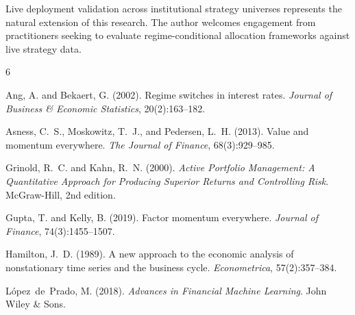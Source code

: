 \documentclass[12pt]{article}
\begin{document}
Live deployment validation across institutional strategy universes represents the natural extension of this research.
The author welcomes engagement from practitioners seeking to evaluate regime-conditional allocation frameworks against live strategy data.


\begin{thebibliography}{6}

Ang, A. and Bekaert, G. (2002).
\newblock Regime switches in interest rates.
\newblock \textit{Journal of Business \& Economic Statistics}, 20(2):163--182.

Asness, C.~S., Moskowitz, T.~J., and Pedersen, L.~H. (2013).
\newblock Value and momentum everywhere.
\newblock \textit{The Journal of Finance}, 68(3):929--985.

Grinold, R.~C. and Kahn, R.~N. (2000).
\newblock \textit{Active Portfolio Management: A Quantitative Approach for Producing Superior Returns and Controlling Risk}.
\newblock McGraw-Hill, 2nd edition.

Gupta, T. and Kelly, B. (2019).
\newblock Factor momentum everywhere.
\newblock \textit{Journal of Finance}, 74(3):1455--1507.

Hamilton, J.~D. (1989).
\newblock A new approach to the economic analysis of nonstationary time series and the business cycle.
\newblock \textit{Econometrica}, 57(2):357--384.

L\'{o}pez~de~Prado, M. (2018).
\newblock \textit{Advances in Financial Machine Learning}.
\newblock John Wiley \& Sons.

\end{thebibliography}
\end{document}
